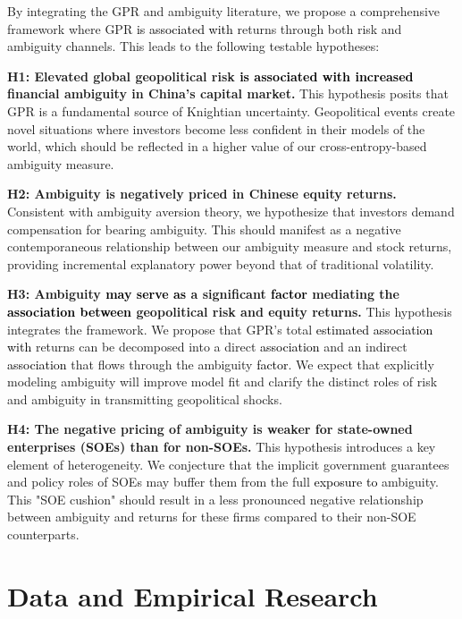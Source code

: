 \documentclass[preprint,12pt,authoryear]{elsarticle}
\begin{document}
By integrating the GPR and ambiguity literature, we propose a comprehensive framework where GPR \textcolor{black}{is associated with} returns through both risk and ambiguity channels. This leads to the following testable hypotheses:

\textbf{H1: Elevated global geopolitical risk \textcolor{black}{is associated with increased} financial ambiguity in China's capital market.}
This hypothesis posits that GPR is a fundamental source of Knightian uncertainty. Geopolitical events create novel situations where investors become less confident in their models of the world, which should be reflected in a higher value of our cross-entropy-based ambiguity measure.

\textbf{H2: Ambiguity is negatively priced in Chinese equity returns.}
Consistent with ambiguity aversion theory, we hypothesize that investors demand compensation for bearing ambiguity. This should manifest as a negative contemporaneous relationship between our ambiguity measure and stock returns, providing incremental explanatory power beyond that of traditional volatility.

\textbf{H3: Ambiguity \textcolor{black}{may serve as} a significant \textcolor{black}{factor} mediating the \textcolor{black}{association between} geopolitical risk and equity returns.}
This hypothesis integrates the framework. We propose that GPR's total \textcolor{black}{estimated association with} returns can be decomposed into a direct \textcolor{black}{association} and an indirect \textcolor{black}{association} that flows through the ambiguity \textcolor{black}{factor}. We expect that explicitly modeling ambiguity will improve model fit and clarify the distinct roles of risk and ambiguity in transmitting geopolitical shocks.

\textbf{H4: The negative pricing of ambiguity is weaker for state-owned enterprises (SOEs) than for non-SOEs.}
This hypothesis introduces a key element of heterogeneity. We conjecture that the implicit government guarantees and policy roles of SOEs may buffer them from the full \textcolor{black}{exposure to} ambiguity. This "SOE cushion" should result in a less pronounced negative relationship between ambiguity and returns for these firms compared to their non-SOE counterparts.


\section{Data and Empirical Research}
\label{sec:data}
\end{document}
